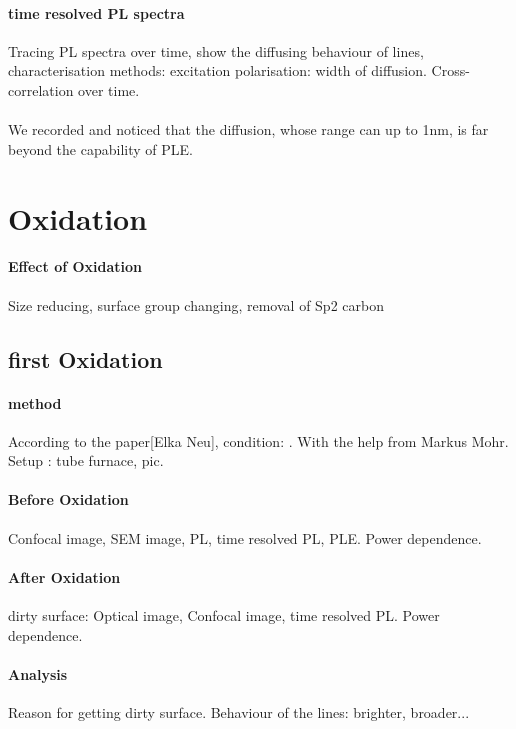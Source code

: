\paragraph{time resolved PL spectra} Tracing PL spectra over time, show the diffusing behaviour of lines, characterisation methods: excitation polarisation: width of diffusion. Cross- correlation over time.
\paragraph{}We recorded and noticed that the diffusion, whose range can up to 1nm, is far beyond the capability of PLE. 

\section{Oxidation}
\paragraph{Effect of Oxidation} Size reducing, surface group changing, removal of Sp2 carbon

\subsection[first Oxidation]{first Oxidation}
\paragraph{method}According to the paper[Elka Neu], condition: . With the help from Markus Mohr. Setup : tube furnace, pic. 

\paragraph{Before Oxidation} Confocal image, SEM image, PL, time resolved PL, PLE. Power dependence.


\paragraph{After Oxidation}dirty surface: Optical image, Confocal image, time resolved PL. Power dependence.

\paragraph{Analysis} Reason for getting dirty surface. Behaviour of the lines: brighter, broader...

